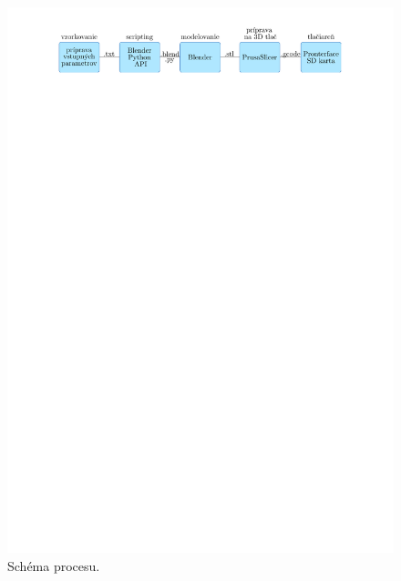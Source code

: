 \begin{figure}[h]
	\centering
	\includegraphics[trim={2.8cm 26cm 0cm 0cm},clip]{images/pipeline3.pdf}
	\caption[Schéma procesu od vstupu až po výstup.]{Schéma procesu.}
	\label{fig:pipeline}
\end{figure}

